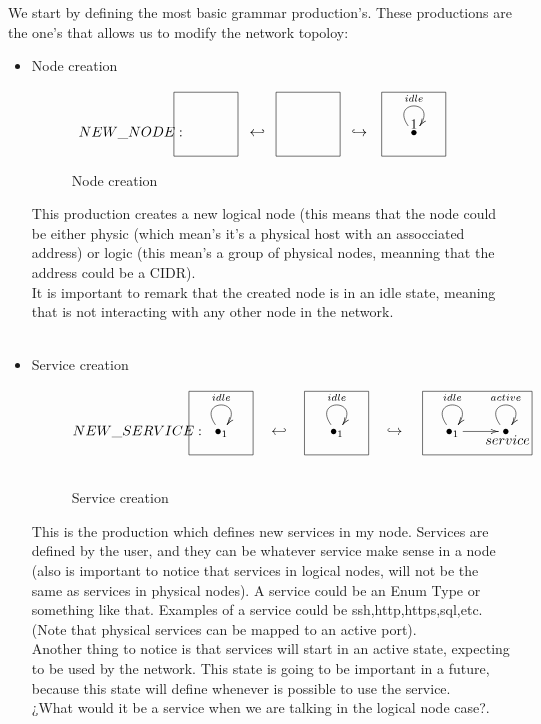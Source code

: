 \documentclass[envcountsect,runningheads]{llncs}
\begin{document}
We start by defining the most basic grammar production's. These 
productions are the one's that allows us to modify the network topoloy:


\begin{itemize}
  \item Node creation
  \begin{figure}[H]
    \[
       \xymatrix@C=25pt@R=16pt
       {
         {}
         \POS[]-<4.5pc,0pc>\drop{NEW\_NODE:}
         \POS[]+<0pc,.5pc> *+=<3.8pc,3.8pc>[F-]{} & {\hookleftarrow} &
         {}
         \POS[]+<0pc,.5pc> *+=<3.8pc,3.8pc>[F-]{} & {\hookrightarrow} &
         {\bullet} \ar@(ul,ur)^{idle}
         \POS[]+<0pc,.5pc> *+=<3.8pc,3.8pc>[F-]{1} &
       }
    \]
    \caption{Node creation}
    \protect\label{fig:nodecreation}
  \end{figure}
  This production creates a new logical node (this means that 
  the node could be either physic (which mean's it's a physical host with an 
  assocciated address) or logic (this mean's a group of physical nodes, meanning
  that the address could be a CIDR). \\
  It is important to remark that the created node is in an idle state, meaning 
  that is not interacting with any other node in the network. \\ 
  \\
  
  \item Service creation
  \begin{figure}[H]
    \[
       \xymatrix@C=25pt@R=16pt
       {
         {\bullet}_{1} \ar@(ul,ur)^{idle}
         \POS[]-<5pc,0pc>\drop{NEW\_SERVICE:}
         \POS[]+<0pc,.5pc> *+=<3.8pc,3.8pc>[F-]{} 
         & {\hookleftarrow} &
         {\bullet}_{1} \ar@(ul,ur)^{idle}
         \POS[]+<0pc,.5pc> *+=<3.8pc,3.8pc>[F-]{} & {\hookrightarrow} &
         {\bullet}_{1} \ar@(ul,ur)^{idle}\ar@{->}[r]
         \POS[]+<1.5pc,.5pc> *+=<6.5pc,3.8pc>[F-]{} &
         {\bullet} \ar@(ul,ur)^{active}
         \POS[]-<-.1pc,.5pc>*+=<4pc,4pc>[]{}\drop{service}
       }
    \]
    \caption{Service creation}
    \protect\label{fig:servicecreation}
  \end{figure}
  This is the production which defines new services in my node. Services are 
  defined by the user, and they can be whatever service make sense in a node (also is important 
  to notice that services in logical nodes, will not be the same as services in physical 
  nodes). A service could be an Enum Type or something like that. Examples of 
  a service could be ssh,http,https,sql,etc. (Note that physical services can be mapped to an 
  active port). \\
  Another thing to notice is that services will start in an active state, 
  expecting to be used by the network. This state is going to be important in a 
  future, because this state will define whenever is possible to use the 
  service. \\
  ¿What would it be a service when we are talking in the logical node case?.\\
  

\end{itemize}
\end{document}
